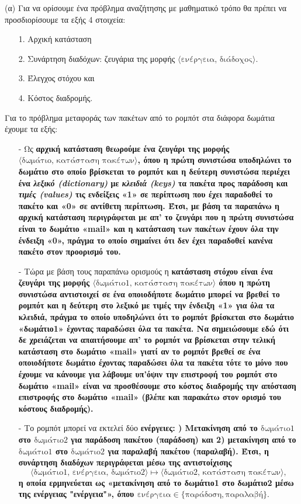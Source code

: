 \documentclass[12pt]{article}
\newcommand {\lat}{\latintext}
\newcommand{\pair}[2]{\langle #1,\, #2 \rangle}
\newcommand{\triple}[3]{\langle #1,\, #2,\, #3 \rangle}
\theoremstyle{definition}
\begin{document}
\noindent (α) Για να ορίσουμε ένα πρόβλημα αναζήτησης με μαθηματικό τρόπο θα πρέπει να προσδιορίσουμε τα εξής 4 στοιχεία:
\begin{itemize}
    \item[1.] Αρχική κατάσταση
    \item[2.] Συνάρτηση διαδόχων: ζευγάρια της μορφής $\langle \text{ενέργεια, διάδοχος} \rangle$.
    \item[3.] Έλεγχος στόχου και
    \item[4.] Κόστος διαδρομής.
\end{itemize}
\noindent Για το πρόβλημα μεταφοράς των πακέτων από το ρομπότ στα διάφορα δωμάτια έχουμε τα εξής:
\begin{itemize}
    \item[-] Ως \bf αρχική κατάσταση \normalfont θεωρούμε ένα ζευγάρι της μορφής $\pair{\text{δωμάτιο}}{\text{κατάσταση πακέτων}}$, όπου η πρώτη συνιστώσα υποδηλώνει το δωμάτιο στο οποίο βρίσκεται το ρομπότ και η δεύτερη συνιστώσα περιέχει ένα \emph{λεξικό ({\lat dictionary})} με \emph{κλειδιά {\lat (keys)}} τα πακέτα προς παράδοση και \emph{τιμές ({\lat values)}} τις ενδείξεις «1» σε περίπτωση που έχει παραδοθεί το πακέτο και «0» σε αντίθετη περίπτωση. Έτσι, με βάση τα παραπάνω η αρχική κατάσταση περιγράφεται με απ' το ζευγάρι που η πρώτη συνιστώσα είναι το δωμάτιο «{\lat mail}» και η κατάσταση των πακέτων έχουν όλα την ένδειξη «0», πράγμα το οποίο σημαίνει ότι δεν έχει παραδοθεί κανένα πακέτο στον προορισμό του.
    
    \item[-] Τώρα με βάση τους παραπάνω ορισμούς η \bf κατάσταση στόχου \normalfont είναι ένα ζευγάρι της μορφής $\pair{\text{δωμάτιο1}}{\text{κατάσταση πακέτων}}$ όπου η πρώτη συνιστώσα αντιστοιχεί σε ένα οποιοδήποτε δωμάτιο μπορεί να βρεθεί το ρομπότ και η δεύτερη στο λεξικό με τιμές την ένδειξη «1» για όλα τα κλειδιά, πράγμα το οποίο υποδηλώνει ότι το ρομπότ βρίσκεται στο δωμάτιο «δωμάτιο1» έχοντας παραδώσει όλα τα πακέτα. Να σημειώσουμε εδώ ότι δε χρειάζεται να απαιτήσουμε απ' το ρομπότ να βρίσκεται στην τελική κατάσταση στο δωμάτιο «{\lat mail}» γιατί αν το ρομπότ βρεθεί σε ένα οποιοδήποτε δωμάτιο έχοντας παραδώσει όλα τα πακέτα τότε το μόνο που έχουμε να κάνουμε για λάβουμε υπ'όψιν την επιστροφή του ρομπότ στο δωμάτιο «{\lat mail}» είναι να προσθέσουμε στο κόστος διαδρομής την απόσταση επιστροφής στο δωμάτιο «{\lat mail}» (βλέπε και παρακάτω στον ορισμό του κόστους διαδρομής).
    
    \item[-] Το ρομπότ μπορεί να εκτελεί δύο \bf ενέργειες: ) Μετακίνηση από το $\text{δωμάτιο1}$ στο $\text{δωμάτιο}2$ για παράδοση πακέτου (παράδοση) και 2) μετακίνηση από το $\text{δωμάτιο}1$ στο $\text{δωμάτιο}2$ για παραλαβή πακέτου (παραλαβή). Έτσι, η \bf συνάρτηση διαδόχων \normalfont περιγράφεται μέσω της αντιστοίχισης
    \[
    \triple{\text{δωμάτιο1}}{\text{ενέργεια}}{\text{δωμάτιο2}}\mapsto \pair{\text{δωμάτιο2}}{\text{κατάσταση πακέτων}},
    \]
    η οποία ερμηνεύεται ως «μετακίνηση από το δωμάτιο1 στο δωμάτιο2 μέσω της ενέργειας "ενέργεια"», όπου $\text{ενέργεια}\in \{\text{παράδοση},\text{παραλαβή}\}.$
    

\end{itemize}
\end{document}
